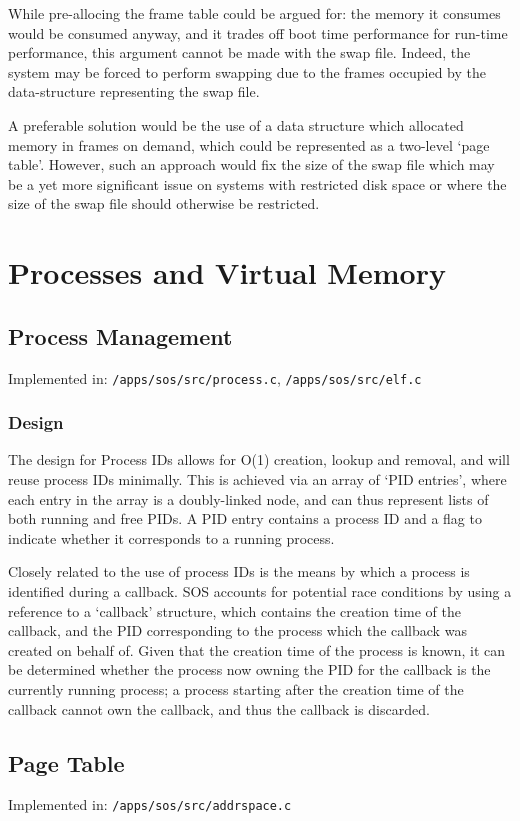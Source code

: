 \documentclass[a4paper,12pt]{article}
\begin{document}
While pre-allocing the frame table could be argued for: the memory it consumes
would be consumed anyway, and it trades off boot time performance for run-time
performance, this argument cannot be made with the swap file.  Indeed, the
system may be forced to perform swapping due to the frames occupied by the
data-structure representing the swap file.

A preferable solution would be the use of a data structure which allocated
memory in frames on demand, which could be represented as a two-level `page
table'.  However, such an approach would fix the size of the swap file which
may be a yet more significant issue on systems with restricted disk space or
where the size of the swap file should otherwise be restricted.

\section{Processes and Virtual Memory}
\subsection{Process Management}
Implemented in: \texttt{/apps/sos/src/process.c}, \texttt{/apps/sos/src/elf.c}

\subsubsection{Design}
The design for Process IDs allows for O(1) creation, lookup and
removal, and will reuse process IDs minimally.  This is achieved via an array
of `PID entries', where each entry in the array is a doubly-linked node, and
can thus represent lists of both running and free PIDs.  A PID entry contains
a process ID and a flag to indicate whether it corresponds to a running
process.

Closely related to the use of process IDs is the means by which a process is
identified during a callback.  SOS accounts for potential race conditions by
using a reference to a `callback' structure, which contains the creation time
of the callback, and the PID corresponding to the process which the callback
was created on behalf of.  Given that the creation time of the process is
known, it can be determined whether the process now owning the PID for the
callback is the currently running process; a process starting after the
creation time of the callback cannot own the callback, and thus the callback
is discarded.

\subsection{Page Table}
Implemented in: \texttt{/apps/sos/src/addrspace.c}
\end{document}
